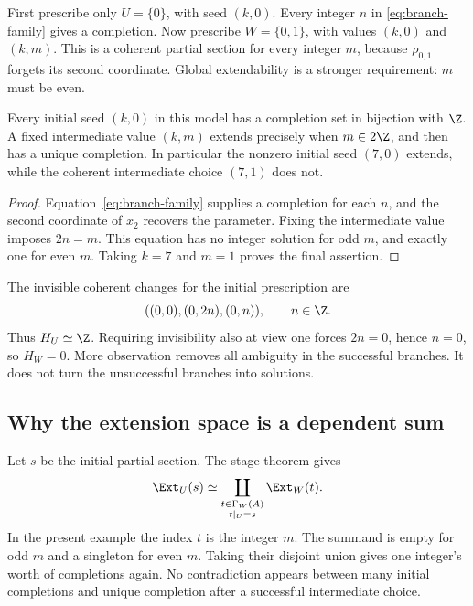 First prescribe only \(U=\{0\}\), with seed \((k,0)\). Every integer \(n\) in \eqref{eq:branch-family} gives a completion. Now prescribe \(W=\{0,1\}\), with values \((k,0)\) and \((k,m)\). This is a coherent partial section for every integer \(m\), because \(\rho_{0,1}\) forgets its second coordinate. Global extendability is a stronger requirement: \(m\) must be even.

\begin{proposition}\label{KS60}
Every initial seed \((k,0)\) in this model has a completion set in bijection with \(\Z\). A fixed intermediate value \((k,m)\) extends precisely when \(m\in2\Z\), and then has a unique completion. In particular the nonzero initial seed \((7,0)\) extends, while the coherent intermediate choice \((7,1)\) does not.
\end{proposition}
\begin{proof}
Equation~\eqref{eq:branch-family} supplies a completion for each \(n\), and the second coordinate of \(x_2\) recovers the parameter. Fixing the intermediate value imposes \(2n=m\). This equation has no integer solution for odd \(m\), and exactly one for even \(m\). Taking \(k=7\) and \(m=1\) proves the final assertion.
\end{proof}
The invisible coherent changes for the initial prescription are
\[
 ((0,0),(0,2n),(0,n)),\qquad n\in\Z.
\]
Thus \(H_U\simeq\Z\). Requiring invisibility also at view one forces \(2n=0\), hence \(n=0\), so \(H_W=0\). More observation removes all ambiguity in the successful branches. It does not turn the unsuccessful branches into solutions.


\subsection{Why the extension space is a dependent sum}
Let \(s\) be the initial partial section. The stage theorem gives
\[
 \Ext_U(s)\simeq
 \coprod_{\substack{t\in\Gamma_W(A)\\t|_U=s}}\Ext_W(t).
\]
In the present example the index \(t\) is the integer \(m\). The summand is empty for odd \(m\) and a singleton for even \(m\). Taking their disjoint union gives one integer's worth of completions again. No contradiction appears between many initial completions and unique completion after a successful intermediate choice.

